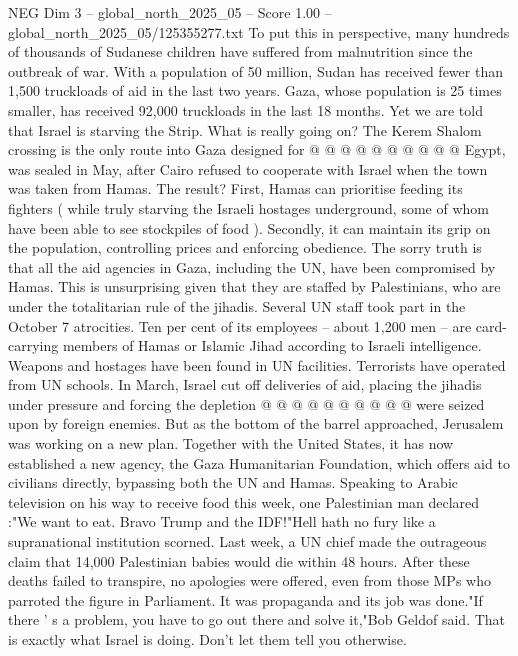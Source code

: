 \begin{textsample}{NEG Dim 3 – global\_north\_2025\_05 – Score 1.00 – global\_north\_2025\_05/125355277.txt}
To put this in perspective, many hundreds of thousands of Sudanese children have suffered from malnutrition since the outbreak of war.
With a population of 50 million, Sudan has received fewer than 1,500 truckloads of aid in the last two years.
Gaza, whose population is 25 times smaller, has received 92,000 truckloads in the last 18 months.
Yet we are told that Israel is starving the Strip.
What is really going on?
The Kerem Shalom crossing is the only route into Gaza designed for @ @ @ @ @ @ @ @ @ @ Egypt, was sealed in May, after Cairo refused to cooperate with Israel when the town was taken from Hamas.
The result?
First, Hamas can prioritise feeding its fighters ( while truly starving the Israeli hostages underground, some of whom have been able to see stockpiles of food ).
Secondly, it can maintain its grip on the population, controlling prices and enforcing obedience.
The sorry truth is that all the aid agencies in Gaza, including the UN, have been compromised by Hamas.
This is unsurprising given that they are staffed by Palestinians, who are under the totalitarian rule of the jihadis.
Several UN staff took part in the October 7 atrocities.
Ten per cent of its employees -- about 1,200 men -- are card-carrying members of Hamas or Islamic Jihad according to Israeli intelligence.
Weapons and hostages have been found in UN facilities.
Terrorists have operated from UN schools.
In March, Israel cut off deliveries of aid, placing the jihadis under pressure and forcing the depletion @ @ @ @ @ @ @ @ @ @ were seized upon by foreign enemies.
But as the bottom of the barrel approached, Jerusalem was working on a new plan.
Together with the United States, it has now established a new agency, the Gaza Humanitarian Foundation, which offers aid to civilians directly, bypassing both the UN and Hamas.
Speaking to Arabic television on his way to receive food this week, one Palestinian man declared :"We want to eat.
Bravo Trump and the IDF!"Hell hath no fury like a supranational institution scorned.
Last week, a UN chief made the outrageous claim that 14,000 Palestinian babies would die within 48 hours.
After these deaths failed to transpire, no apologies were offered, even from those MPs who parroted the figure in Parliament.
It was propaganda and its job was done."If there ' s a problem, you have to go out there and solve it,"Bob Geldof said.
That is exactly what Israel is doing.
Don't let them tell you otherwise.

\end{textsample}
